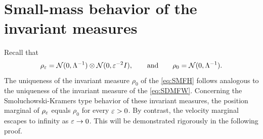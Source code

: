 

\section{Small-mass behavior of the invariant measures}\label{sec_invdynamics_SKA}

Recall that
\[
    \rho_\varepsilon
    =
    \mathcal{N}(0, \Lambda^{-1}) \otimes \mathcal{N}(0, \varepsilon^{-2}I),
    \qquad \text{and} \qquad
    \rho_0=\mathcal N(0,\Lambda^{-1}).
\]
The uniqueness of the invariant measure $\rho_0$ of the \eqref{eq:SMFH} follows analogous to the uniqueness of the invariant measure of the \eqref{eq:SDMFW}.
Concerning the Smoluchowski-Kramers type behavior of these invariant measures, the position marginal of \(\rho_\varepsilon\) equals \(\rho_0\) for every
\(\varepsilon>0\). By contrast, the velocity marginal escapes to infinity as \(\varepsilon\to0\). This will be demonstrated rigorously in the following proof.

